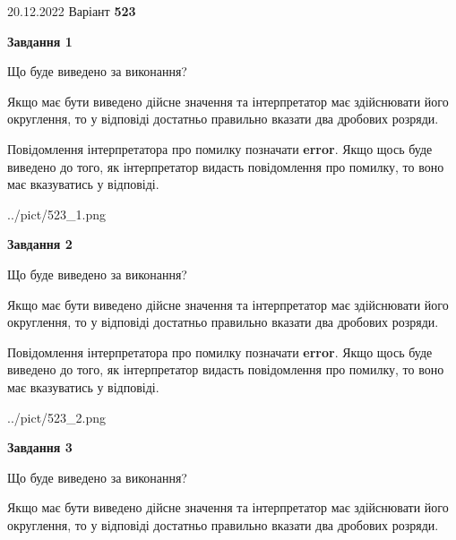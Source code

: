 \documentclass[12pt, ukrainian]{article}
\begin{document}
{20.12.2022 Варіант \No \textbf { 523 }\par}
{
\begin {Large}

{\begin {center}\textbf{Завдання 1}\end {center}}\par
Що буде виведено за виконання? \par

Якщо має бути виведено дійсне значення та інтерпретатор має здійснювати його округлення, 
то у відповіді достатньо правильно вказати два дробових розряди.

Повідомлення інтерпретатора про помилку позначати \textbf{error}.
Якщо щось буде виведено до того, як інтерпретатор видасть повідомлення про помилку, 
то воно має вказуватись у відповіді. \par

\begin{center}
	{../pict/523_1.png}
\end{center}
\newpage

{\begin {center}\textbf{Завдання 2}\end {center}}\par
Що буде виведено за виконання? \par

Якщо має бути виведено дійсне значення та інтерпретатор має здійснювати його округлення, 
то у відповіді достатньо правильно вказати два дробових розряди.

Повідомлення інтерпретатора про помилку позначати \textbf{error}.
Якщо щось буде виведено до того, як інтерпретатор видасть повідомлення про помилку, 
то воно має вказуватись у відповіді. \par

\begin{center}
	{../pict/523_2.png}
\end{center}
\newpage

{\begin {center}\textbf{Завдання 3}\end {center}}\par
Що буде виведено за виконання? \par

Якщо має бути виведено дійсне значення та інтерпретатор має здійснювати його округлення, 
то у відповіді достатньо правильно вказати два дробових розряди.


\end{Large}}
\end{document}
